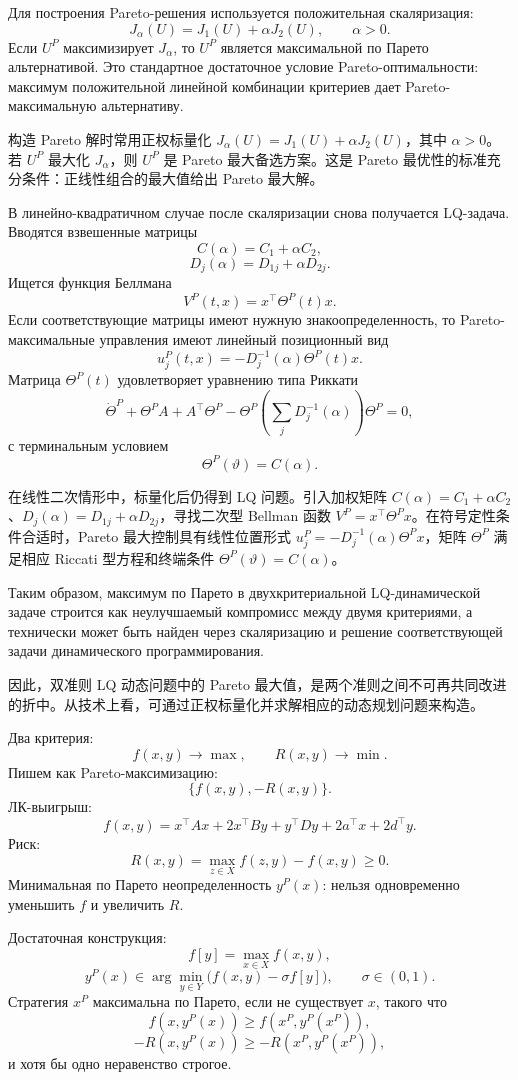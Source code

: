 \documentclass[12pt,a4paper]{article}
\newcommand{\memory}{}
\newcommand{\zh}[1]{\par\noindent #1\par}
\begin{document}
Для построения Pareto-решения используется положительная скаляризация:
\[
J_\alpha(U)=J_1(U)+\alpha J_2(U),
\qquad \alpha>0.
\]
Если \(U^P\) максимизирует \(J_\alpha\), то \(U^P\) является максимальной по Парето альтернативой. Это стандартное достаточное условие Pareto-оптимальности: максимум положительной линейной комбинации критериев дает Pareto-максимальную альтернативу.
\zh{构造 Pareto 解时常用正权标量化 \(J_\alpha(U)=J_1(U)+\alpha J_2(U)\)，其中 \(\alpha>0\)。若 \(U^P\) 最大化 \(J_\alpha\)，则 \(U^P\) 是 Pareto 最大备选方案。这是 Pareto 最优性的标准充分条件：正线性组合的最大值给出 Pareto 最大解。}

В линейно-квадратичном случае после скаляризации снова получается LQ-задача. Вводятся взвешенные матрицы
\[
C(\alpha)=C_1+\alpha C_2,
\]
\[
D_j(\alpha)=D_{1j}+\alpha D_{2j}.
\]
Ищется функция Беллмана
\[
V^P(t,x)=x^{\top}\Theta^P(t)x.
\]
Если соответствующие матрицы имеют нужную знакоопределенность, то Pareto-максимальные управления имеют линейный позиционный вид
\[
u_j^P(t,x)=-D_j^{-1}(\alpha)\Theta^P(t)x.
\]
Матрица \(\Theta^P(t)\) удовлетворяет уравнению типа Риккати
\[
\dot\Theta^P+
\Theta^P A+A^{\top}\Theta^P-
\Theta^P\left(\sum_jD_j^{-1}(\alpha)\right)\Theta^P=0,
\]
с терминальным условием
\[
\Theta^P(\vartheta)=C(\alpha).
\]
\zh{在线性二次情形中，标量化后仍得到 LQ 问题。引入加权矩阵 \(C(\alpha)=C_1+\alpha C_2\)、\(D_j(\alpha)=D_{1j}+\alpha D_{2j}\)，寻找二次型 Bellman 函数 \(V^P=x^\top\Theta^P x\)。在符号定性条件合适时，Pareto 最大控制具有线性位置形式 \(u_j^P=-D_j^{-1}(\alpha)\Theta^P x\)，矩阵 \(\Theta^P\) 满足相应 Riccati 型方程和终端条件 \(\Theta^P(\vartheta)=C(\alpha)\)。}

Таким образом, максимум по Парето в двухкритериальной LQ-динамической задаче строится как неулучшаемый компромисс между двумя критериями, а технически может быть найден через скаляризацию и решение соответствующей задачи динамического программирования.
\zh{因此，双准则 LQ 动态问题中的 Pareto 最大值，是两个准则之间不可再共同改进的折中。从技术上看，可通过正权标量化并求解相应的动态规划问题来构造。}

\memory
Два критерия:
\[
f(x,y)\to\max,
\qquad R(x,y)\to\min.
\]
Пишем как Pareto-максимизацию:
\[
\{f(x,y),-R(x,y)\}.
\]
ЛК-выигрыш:
\[
f(x,y)=x^{\top}Ax+2x^{\top}By+y^{\top}Dy+2a^{\top}x+2d^{\top}y.
\]
Риск:
\[
R(x,y)=\max_{z\in X}f(z,y)-f(x,y)\ge0.
\]
Минимальная по Парето неопределенность \(y^P(x)\): нельзя одновременно уменьшить \(f\) и увеличить \(R\).

Достаточная конструкция:
\[
f[y]=\max_{x\in X}f(x,y),
\]
\[
y^P(x)\in\arg\min_{y\in Y}\bigl(f(x,y)-\sigma f[y]\bigr),
\qquad \sigma\in(0,1).
\]
Стратегия \(x^P\) максимальна по Парето, если не существует \(x\), такого что
\[
f(x,y^P(x))\ge f(x^P,y^P(x^P)),
\]
\[
-R(x,y^P(x))\ge -R(x^P,y^P(x^P)),
\]
и хотя бы одно неравенство строгое.
\end{document}
